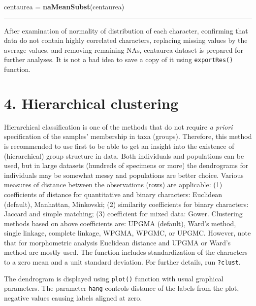 \documentclass[
]{article}
\newenvironment{Shaded}{\begin{snugshade}}{\end{snugshade}}
\newcommand{\KeywordTok}[1]{\textcolor[rgb]{0.13,0.29,0.53}{\textbf{#1}}}
\newcommand{\NormalTok}[1]{#1}
\newcommand{\StringTok}[1]{\textcolor[rgb]{0.31,0.60,0.02}{#1}}
\begin{document}
\begin{Shaded}
\begin{Highlighting}[]
\NormalTok{centaurea =}\StringTok{ }\KeywordTok{naMeanSubst}\NormalTok{(centaurea)}
\end{Highlighting}
\end{Shaded}

\begin{center}\rule{0.5\linewidth}{\linethickness}\end{center}

After examination of normality of distribution of each character,
confirming that data do not contain highly correlated characters,
replacing missing values by the average values, and removing remaining
NAs, centaurea dataset is prepared for further analyses. It is not a bad
idea to save a copy of it using \texttt{exportRes()} function.

\hypertarget{hierarchical-clustering}{%
\section{4. Hierarchical clustering}\label{hierarchical-clustering}}

Hierarchical classification is one of the methods that do not require
\emph{a priori} specification of the samples' membership in taxa
(groups). Therefore, this method is recommended to use first to be able
to get an insight into the existence of (hierarchical) group structure
in data. Both individuals and populations can be used, but in large
datasets (hundreds of specimens or more) the dendrograms for individuals
may be somewhat messy and populations are better choice. Various
measures of distance between the observations (rows) are applicable: (1)
coefficients of distance for quantitative and binary characters:
Euclidean (default), Manhattan, Minkovski; (2) similarity coefficients
for binary characters: Jaccard and simple matching; (3) coefficient for
mixed data: Gower. Clustering methods based on above coefficients are:
UPGMA (default), Ward's method, single linkage, complete linkage, WPGMA,
WPGMC, or UPGMC. However, note that for morphometric analysis Euclidean
distance and UPGMA or Ward's method are mostly used. The function
includes standardization of the characters to a zero mean and a unit
standard deviation. For further details, run \texttt{?clust}.

The dendrogram is displayed using \texttt{plot()} function with usual
graphical parameters. The parameter \texttt{hang} controls distance of
the labels from the plot, negative values causing labels aligned at
zero.
\end{document}
